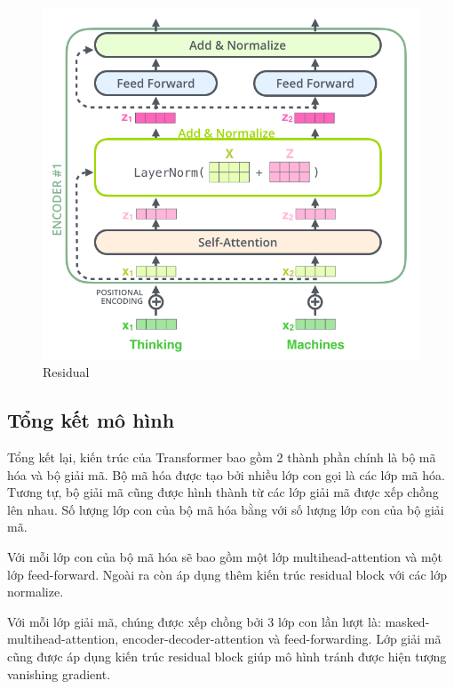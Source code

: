 \begin{figure}[H]
    \begin{center}
        \includegraphics[scale=0.5]{images/residual}
        \caption{Residual}
        \label{fig:residual}
    \end{center}
\end{figure}


\subsection{Tổng kết mô hình}

Tổng kết lại, kiến trúc của Transformer bao gồm 2 thành phần chính là bộ mã hóa và bộ giải mã. Bộ mã hóa được tạo bởi nhiều lớp con gọi là các lớp mã hóa. Tương tự, bộ giải mã cũng được hình thành từ các lớp giải mã được xếp chồng lên nhau. Số lượng lớp con của bộ mã hóa bằng với số lượng lớp con của bộ giải mã.

Với mỗi lớp con của bộ mã hóa sẽ bao gồm một lớp multihead-attention và một lớp feed-forward. Ngoài ra còn áp dụng thêm kiến trúc residual block với các lớp normalize.

Với mỗi lớp giải mã, chúng được xếp chồng bởi 3 lớp con lần lượt là: masked-multihead-attention, encoder-decoder-attention và feed-forwarding. Lớp giải mã cũng được áp dụng kiến trúc residual block giúp mô hình tránh được hiện tượng vanishing gradient.

